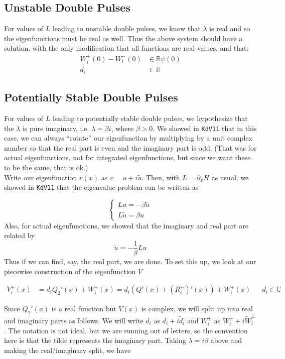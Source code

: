 \documentclass[12pt]{article}
\def\R{{\mathbb R}}
\def\C{{\mathbb C}}
\begin{document}
\subsection*{Unstable Double Pulses}
For values of $L$ leading to unstable double pulses, we know that $\lambda$ is real and so the eigenfunctions must be real as well. Thus the above system should have a solution, with the only modification that all functions are real-values, and that:
\begin{align*}
W_i^+(0) - W_i^-(0) &\in \R \psi(0) \\
d_i &\in \R
\end{align*}

\subsection*{Potentially Stable Double Pulses}
For values of $L$ leading to potentially stable double pulses, we hypothesize that the $\lambda$ is pure imaginary, i.e. $\lambda = \beta i$, where $\beta > 0$. We showed in \texttt{KdV11} that in this case, we can always ``rotate'' our eigenfunction by multiplying by a unit complex number so that the real part is even and the imaginary part is odd. (That was for actual eigenfunctions, not for integrated eigenfunctions, but since we want these to be the same, that is ok.)\\

Write our eigenfunction $v(x)$ as $v = u + i \tilde{u}$. Then, with $L = \partial_x H$ as usual, we showed in \texttt{KdV11} that the eigenvalue problem can be written as

\[ \begin{cases}
Lu = -\beta \tilde{u} \\
L\tilde{u} = \beta u
\end{cases}
\]
Also, for actual eigenfunctions, we showed that the imaginary and real part are related by
\[
\tilde{u} = -\frac{1}{\beta}Lu
\]
Thus if we can find, say, the real part, we are done. To set this up, we look at our piecewise construction of the eigenfunction $V$

\begin{align}
V_i^\pm(x) &= d_i Q_2'(x) + W_i^\pm(x) = d_i (Q'(x) + (R_i^\pm)'(x)) + W_i^\pm(x) && d_i \in \C
\end{align}

Since $Q_2'(x)$ is a real function but $V(x)$ is complex, we will split up into real and imaginary parts as follows. We will write $d_i$ as $d_i + i \tilde{d}_i$ and $W_i^\pm$ as $W_i^\pm + i \tilde{W}_i^\pm$. The notation is not ideal, but we are running out of letters, so the convention here is that the tilde represents the imaginary part. Taking $\lambda = i \beta$ above and making the real/imaginary split, we have
\end{document}
